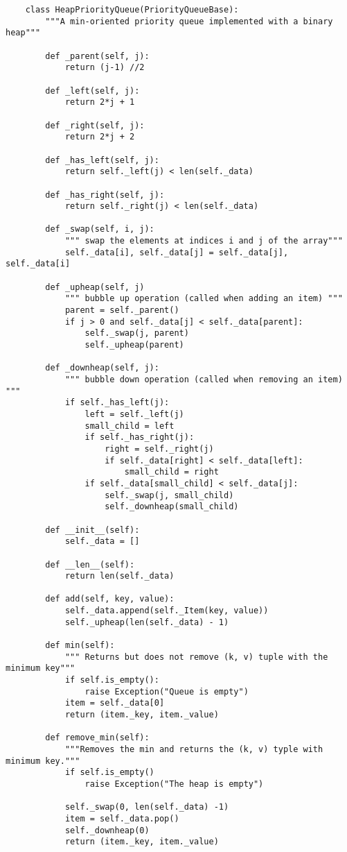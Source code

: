 \documentclass[]{article}
\begin{document}
\begin{lstlisting}
	class HeapPriorityQueue(PriorityQueueBase):
		"""A min-oriented priority queue implemented with a binary heap"""
		
		def _parent(self, j):
			return (j-1) //2
			
		def _left(self, j):
			return 2*j + 1
			
		def _right(self, j):
			return 2*j + 2
		
		def _has_left(self, j):
			return self._left(j) < len(self._data)
			
		def _has_right(self, j):
			return self._right(j) < len(self._data)
	
		def _swap(self, i, j):
			""" swap the elements at indices i and j of the array"""
			self._data[i], self._data[j] = self._data[j], self._data[i]
			
		def _upheap(self, j)
			""" bubble up operation (called when adding an item) """
			parent = self._parent()
			if j > 0 and self._data[j] < self._data[parent]:
				self._swap(j, parent)
				self._upheap(parent)
		
		def _downheap(self, j):
			""" bubble down operation (called when removing an item) """
			if self._has_left(j):
				left = self._left(j)
				small_child = left
				if self._has_right(j):
					right = self._right(j)
					if self._data[right] < self._data[left]:
						small_child = right
				if self._data[small_child] < self._data[j]:
					self._swap(j, small_child)
					self._downheap(small_child)
		
		def __init__(self):
			self._data = []
			
		def __len__(self):
			return len(self._data)
			
		def add(self, key, value):
			self._data.append(self._Item(key, value))
			self._upheap(len(self._data) - 1)
			
		def min(self):
			""" Returns but does not remove (k, v) tuple with the minimum key"""
			if self.is_empty():
				raise Exception("Queue is empty")
			item = self._data[0]
			return (item._key, item._value)	
			
		def remove_min(self):
			"""Removes the min and returns the (k, v) typle with minimum key."""
			if self.is_empty()
				raise Exception("The heap is empty")
			
			self._swap(0, len(self._data) -1)
			item = self._data.pop()
			self._downheap(0)
			return (item._key, item._value)
		
\end{lstlisting}\bigbreak
\end{document}
